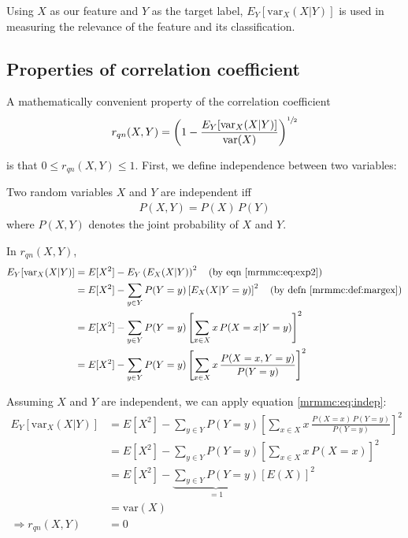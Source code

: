 \documentclass[12pt, twoside, a4paper]{report}
\def\var{\text{var}}
\begin{document}
Using $X$ as our feature and $Y$ as the target label, $E_Y[\var_X(X|Y)]$ is used in measuring the relevance of the feature and its classification.

\subsection{Properties of correlation coefficient}
A mathematically convenient property of the correlation coefficient
\begin{align*}
r_{qn}(X, Y) = \left( 1 - \frac{E_Y[\var_X(X|Y)]}{\var(X)} \right)^{\sfrac{1}{2}}
\end{align*}

is that $0 \leq r_{qn}(X, Y) \leq 1$. First, we define independence between two variables:\\

\begin{mydef}[Independence]
Two random variables $X$ and $Y$ are independent iff
\begin{align}
P(X, Y) = P(X) \, P(Y) \label{mrmmc:eq:indep}
\end{align}
where $P(X, Y)$ denotes the joint probability of $X$ and $Y$.
\end{mydef}

In $r_{qn}(X,Y)$,
\begin{align*}
E_Y[\var_X(X|Y)]
&= E[X^2] - E_Y\left( E_X(X|Y) \right)^2 \quad \text{(by eqn \ref{mrmmc:eq:exp2})} \\
&= E[X^2] - \sum_{y\in Y} P(Y=y) \left[ E_X(X|Y=y) \right]^2 \quad \text{(by defn \ref{mrmmc:def:margex})} \\
&= E[X^2] - \sum_{y\in Y} P(Y=y) \left[ \sum_{x \in X} x \, P(X=x|Y=y) \right]^2 \\
&= E[X^2] - \sum_{y\in Y} P(Y=y) \left[ \sum_{x \in X} x \, \frac{P(X=x, Y=y)}{P(Y=y)} \right]^2
\end{align*}

Assuming $X$ and $Y$ are independent, we can apply equation \ref{mrmmc:eq:indep}:
\begin{align*}
E_Y[\var_X(X|Y)]
&= E[X^2] - \sum_{y\in Y} P(Y=y) \left[ \sum_{x \in X} x \, \frac{P(X=x) \, P(Y=y)}{P(Y=y)} \right]^2 \\
&= E[X^2] - \sum_{y\in Y} P(Y=y) \left[ \sum_{x \in X} x \, P(X=x) \right]^2 \\
&= E[X^2] - \underbrace{\sum_{y\in Y} P(Y=y)}_{=1} \left[ E(X) \right]^2 \\
&= \var(X) \\
\Rightarrow r_{qn}(X,Y) &= 0
\end{align*}
\end{document}
